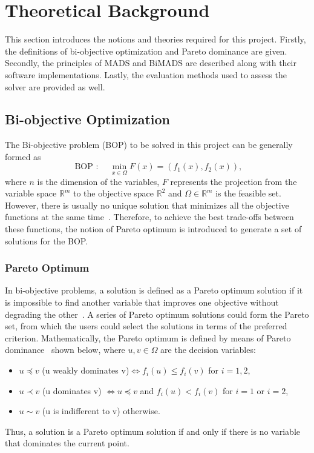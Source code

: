 \documentclass[11pt,oneside,onecolumn,openright]{article}
\begin{document}
\section{Theoretical Background}\label{sec:theoback}
  This section introduces the notions and theories required for this project. Firstly, the definitions of bi-objective optimization and Pareto dominance are given. Secondly, the principles of MADS and BiMADS are described along with their software implementations. Lastly, the evaluation methods used to assess the solver are provided as well.
  \subsection{Bi-objective Optimization}
  The Bi-objective problem (BOP) to be solved in this project can be generally formed as
  \begin{equation}
  \text { BOP : } \quad \min _{x \in \Omega} F(x)=\left(f_{1}(x), f_{2}(x)\right),
  \end{equation}
  where $n$ is the dimension of the variables, $F$ represents the projection from the variable space $\mathbb{R}^{m}$ to the objective space $\mathbb{R}^{2}$ and $\Omega \in \mathbb{R}^{m}$ is the feasible set. However, there is usually no unique solution that minimizes all the objective functions at the same time~\cite{dejemeppe2015derivative}. Therefore, to achieve the best trade-offs between these functions, the notion of Pareto optimum is introduced to generate a set of solutions for the BOP.

  \subsubsection*{Pareto Optimum}
    In bi-objective problems, a solution is defined as a Pareto optimum solution if it is impossible to find another variable that improves one objective without degrading the other~\cite{zitzler2000comparison}. A series of Pareto optimum solutions could form the Pareto set, from which the users could select the solutions in terms of the preferred criterion. Mathematically, the Pareto optimum is defined by means of Pareto dominance~\cite{audet2008multiobjective} shown below, where $u,v\in \Omega$ are the decision variables: 
    \begin{itemize}
    \item $u \preceq v$ (u weakly dominates v)$ \iff f_{i}(u) \leq f_{i}(v)$ for $i=1,2$,
    \item $u \prec v$ (u dominates v) $\iff u \preceq v$ and $f_{i}(u) < f_{i}(v)$ for $i=1$ or $i=2$,
    \item $u \sim v$ (u is indifferent to v) otherwise.
    \end{itemize}
    Thus, a solution is a Pareto optimum solution if and only if there is no variable that dominates the current point.
\end{document}
